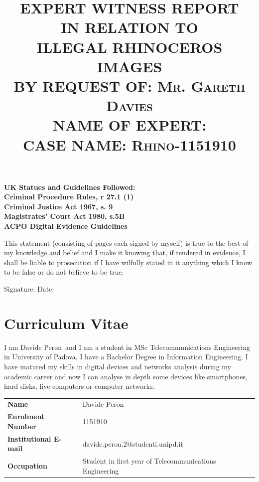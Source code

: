 \documentclass{article}
\title{
	\textmd{\textbf{EXPERT WITNESS REPORT}}\\
	\vspace{0.3in}
	\textsc{\Large IN RELATION TO}\\
	\vspace{0.3in}
	\textmd{\textbf{ILLEGAL RHINOCEROS IMAGES}}\\
	\vspace{0.7in}
	\textmd{\Large \textbf{BY REQUEST OF: }}
	\textsc{\Large Mr. Gareth Davies}\\
	\vspace{0.1in}
	\textmd{\Large \textbf{NAME OF EXPERT: }}
	\textsc{\Large \writer}\\
	\vspace{0.1in}
	\textmd{\Large \textbf{CASE NAME: }}
	\textsc{\Large Rhino-1151910}
	\date{}
}
\newcommand{\writer}{Davide Peron}
\begin{document}
\parbox{0.4\textwidth}{
	\normalsize
	\textbf{UK Statues and Guidelines Followed:\\
	Criminal Procedure Rules, r 27.1 (1)\\
	Criminal Justice Act 1967, s. 9\\
	Magistrates’ Court Act 1980, s.5B\\
	ACPO Digital Evidence Guidelines}
}

\vspace{0.5in}

{\let\newpage\relax\maketitle}

\centering
\parbox{0.7\textwidth}{
	This statement (consisting of \protect\pageref{LastPage}
	pages each signed by myself) is true to the best of
	my knowledge and belief and I make it knowing that, if tendered in evidence, I shall
	be liable to prosecution if I have wilfully stated in it anything which I know to be false
	or do not believe to be true.
}

\parbox{0.7\textwidth}{
	\vspace{0.2in}
	Signature: \hspace{2in} Date:
}


\newpage
\tableofcontents
\newpage

\section{Curriculum Vitae}

I am \writer ~and I am a student in MSc Telecommunications Engineering in University of Padova. I have a Bachelor Degree in Information Engineering.
I have matured my skills in digital devices and networks analysis during my academic career and now I can analyse in depth some devices like smartphones, hard disks, live computers or computer networks.

\vspace{0.3in}

\begin{tabular}{l l}
	\textbf{Name} & \writer\\
	\textbf{Enrolment Number} & 1151910\\
	\textbf{Institutional E-mail} & davide.peron.2@studenti.unipd.it\\
	\textbf{Occupation} & Student in first year of Telecommunications Engineering
\end{tabular}
\end{document}
